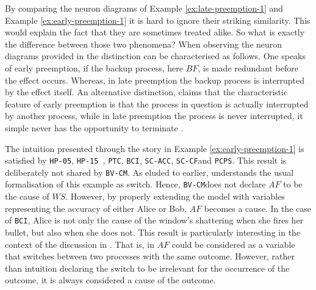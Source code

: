 \documentclass[11pt,a4paper]{book}
\theoremstyle{definition}
\theoremstyle{definition}
\theoremstyle{definition}
\theoremstyle{remark}
\newcommand{\hpu}{\texttt{HP-05}}
\newcommand{\ptc}{\texttt{PTC}}
\newcommand{\hpm}{\texttt{HP-15 }}
\newcommand{\bvcm}{\texttt{BV-CM}}
\newcommand{\bci}{\texttt{BCI}}
\newcommand{\scacc}{\texttt{SC-ACC}}
\newcommand{\pcps}{\texttt{PCPS}}
\newcommand{\sccf}{\texttt{SC-CF}}
\begin{document}
By comparing the neuron diagrams of Example \ref{ex:late-preemption-1} and Example \ref{ex:early-preemption-1} it is hard to ignore their striking similarity.
This would explain the fact that they are sometimes treated alike. So what is exactly the difference between those two phenomena?
When observing the neuron diagrams provided in \parencite{baumgartner2013regularity} the distinction can be characterised as follows.
One speaks of early preemption, if the backup process, here $BF$, is made redundant before the effect occurs. Whereas, in late preemption the backup process is 
interrupted by the effect itself. 
An alternative distinction, claims that the characteristic feature of early preemption is that the process in question is actually interrupted by another process, while in late preemption the 
process is never interrupted, it simple never has the opportunity to terminate \parencite{baumgartner2013regularity}.


The intuition presented through the story in Example \ref{ex:early-preemption-1} is satisfied by \hpu, \hpm, \ptc, \bci, \scacc, \sccf and \pcps \parencite{bochman2018actual,denecker2018causal,weslake2015partial,batusov2018situation}.
This result is deliberately not shared by \bvcm.
As eluded to earlier, \parencite{beckers2018principled} understands the usual formalisation of this example as switch. Hence, \bvcm does not declare $AF$ to be the cause of $WS$.
However, by properly extending the model with variables representing the accuracy of either Alice or Bob, $AF$ becomes a cause.
In the case of \bci, Alice is not only the cause of the window's shattering when she fires her bullet, but also when she does not. This result is particularly interesting in the context of the discussion in \parencite{beckers2018principled}.
That is, in \parencite{bochman2018actual} $AF$ could be considered as a variable that switches between two processes with the same outcome. However, rather than intuition declaring the switch to be irrelevant for the occurrence of the outcome, it is always considered a cause of the outcome.





%
%
\end{document}
